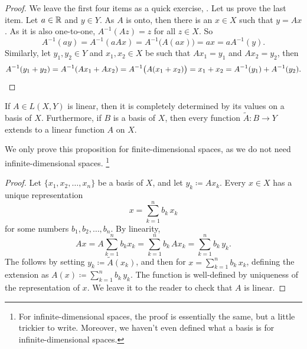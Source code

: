 \begin{proof}
We leave the first four items as a quick exercise,
.
Let us prove the last item.
Let $a \in {\mathbb{R}}$ and $y \in Y$.  As $A$ is onto, then there is an 
$x \in X$ such that $y = Ax$.
As it is also one-to-one, $A^{-1}(Az) = z$ for all $z \in X$.
So
\begin{equation*}
A^{-1}(ay)
=
A^{-1}(aAx)
=
A^{-1}\bigl(A(ax)\bigr)
= ax
= aA^{-1}(y).
\end{equation*}
Similarly, let $y_1,y_2 \in Y$ and $x_1, x_2 \in X$ be such that
$Ax_1 = y_1$ and 
$Ax_2 = y_2$, then
\begin{equation*}
A^{-1}(y_1+y_2)
=
A^{-1}(Ax_1+Ax_2)
=
A^{-1}\bigl(A(x_1+x_2)\bigr)
= x_1+x_2
= A^{-1}(y_1) + A^{-1}(y_2). \qedhere
\end{equation*}
\end{proof}

\begin{prop} \label{mv:lindefonbasis}
If $A \in L(X,Y)$ is linear, then it is completely determined
by its values on a basis of $X$.
Furthermore, if $B$ is a basis of $X$,
then every function $\widetilde{A} \colon B \to Y$ extends to a linear
function $A$ on $X$.
\end{prop}

We only prove this proposition for finite-dimensional spaces, as we do
not need infinite-dimensional spaces.%
\footnote{For infinite-dimensional spaces, the proof is essentially the same, but a
little trickier to write.
Moreover, we haven't even defined what a basis is for
infinite-dimensional spaces.}

\begin{proof}
Let $\{ x_1, x_2, \ldots, x_n \}$ be a basis of $X$, and let 
$y_k \coloneqq A x_k$.  Every $x \in X$ has a unique representation
\begin{equation*}
x = \sum_{k=1}^n b_k \, x_k
\end{equation*}
for some numbers $b_1,b_2,\ldots,b_n$.  By linearity,
\begin{equation*}
Ax = 
A\sum_{k=1}^n b_k x_k
=
\sum_{k=1}^n b_k \, Ax_k
=
\sum_{k=1}^n b_k \, y_k .
\end{equation*}
The  follows by setting $y_k \coloneqq \widetilde{A}(x_k)$,
and then for 
$x = \sum_{k=1}^n b_k \, x_k$,
defining the extension as
$A(x) \coloneqq \sum_{k=1}^n b_k \, y_k$.  The function is well-defined by
uniqueness of the representation of $x$.
We leave it to the reader to check that $A$ is linear.
\end{proof}

